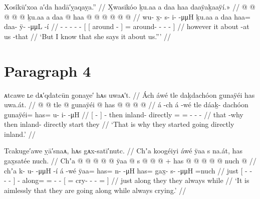 \ex\label{ex:92-57-I-know-she-says}%
%
\begingl
	\glpreamble	Xosîkū′xoa a′da hadā′ỵaqaỵa.” //
	\glpreamble	X̱wasikóo ḵu.aa a daa haa daaÿaḵaaÿí.\!» //
	\gla	{} @ {} @ {} @ {} @ {} @ {} ḵu.aa
		{} {} a daa @ {} {}
			haa @  @ {} @ {} @ {} @ {} @ {} //
	\glb	wu- x̱- s- i-  -μμH ḵu.aa
		{} {} a daa {} {}
			haa= daa- ÿ-  -μμL -í {} //
	\glc	{}- - - -  - 
		{}[ {}[  around - {}]
			= around- -  - - {}] //
	\gld	{} {} {} {} {} {} however
		{} {} it about -at {}
			us  {} {} {} -that {} //
	\glft	‘But I know that she says it about us.”’
		//
\endgl
\xe


\section{Paragraph 4}\label{sec:92-para-4}

\ex\label{ex:92-58-why-they-went-directly-inland}%
%
\begingl
	\glpreamble	ᴀtcawe ʟe dᴀ′qdatcūn g̣onaỵe′ hᴀs uwaᴀ′t. //
	\glpreamble	Ách áwé tle daḵdachóon g̱unaÿéi has uwa.át. //
	\gla	{}  @ {} {}  @ {}
		tle  @ {}
		g̱unaÿéi @ has @  @ {} @ {} @ {} //
	\glb	{} á -ch {} á -wé
		tle dáaḵ- dachóon
		g̱unaÿéi= has= u- i-  -μH //
	\glc	{}[  - {}]  -
		then inland- directly
		= = - -  - //
	\gld	{} that -why {}  {}
		then inland- directly
		start they  {} {} {} //
	\glft	‘That is why they started going directly inland.’
		//
\endgl
\xe

\ex\label{ex:92-59-going-anywhere-crying}%
%
\begingl
	\glpreamble	Tcakuge′awe ỵā′snaᴀ, hᴀs gᴀx-satī′nutc. //
	\glpreamble	Chʼa koogéiyi áwé ÿaa s na.át, has gax̱satée nuch. //
	\gla	Chʼa {}  @ {} @ {} @ {} @ {} {}
		 @ {}
		ÿaa @ s @  @ {} @ {} +
		{} has @  @ {} @ {} @ {} @ \•nuch @ {} {} //
	\glb	chʼa {} k- u-  -μμH -í {}
		á -wé
		ÿaa= has= n-  -μH
		{} has= gax̱- s-  -μμH =nuch {} {} //
	\glc	just {}[ - -  - - {}]
		 -
		along= = -  -
		{}[ = cry- -
			 - = \· {}] //
	\gld	just {}  {} {} {} {} {}
		 {}
		along\• they  {} {}
		{} they  {} {} {} \•always \·while {} //
	\glft	‘It is aimlessly that they are going along while always crying.’
		//
\endgl
\xe

